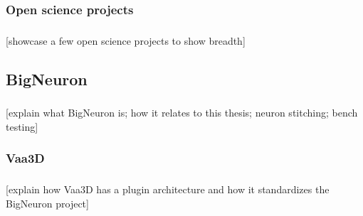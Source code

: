 \documentclass{beamer}
\newcommand{\tbackground}[1]{#1}
\newcommand{\tbackground}[1]{\textcolor{tbackground}{#1}}
\begin{document}
\subsubsection{Open science projects}
\begin{frame}\frametitle{\subsubsecname}
	[\tbackground{showcase a few open science projects to show breadth}]
\end{frame}

\subsection{BigNeuron}
\begin{frame}\frametitle{\subsecname}
	[\tbackground{explain what BigNeuron is; how it relates to this thesis;
		neuron stitching; bench testing}]
\end{frame}

\subsubsection{Vaa3D}
\begin{frame}\frametitle{\subsecname}
	[\tbackground{explain how Vaa3D has a plugin architecture and how it
	standardizes the BigNeuron project}]
\end{frame}
\end{document}
